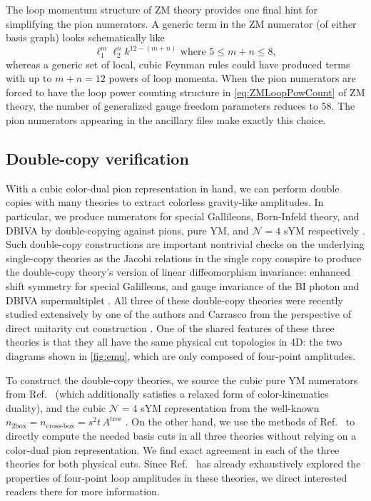 \documentclass[11pt,letter]{article}
\newcommand{\atree}{\ensuremath{A^{\text{tree}}}}
\begin{document}
The loop momentum structure of ZM theory provides one final hint for
simplifying the pion numerators.  A generic term in the ZM numerator
(of either basis graph) looks schematically like
\begin{equation}
\label{eq:ZMLoopPowCount}
\ell_1^m \ell_2^n k^{12-(m+n)} \text{ where } 5 \leq m+n \leq 8,
\end{equation}
whereas a generic set of local, cubic Feynman rules could have
produced terms with up to $m+n=12$ powers of loop momenta.  When the
pion numerators are forced to have the loop power counting structure in
\cref{eq:ZMLoopPowCount} of ZM theory, the number of generalized gauge
freedom parameters reduces to 58.  The pion numerators appearing in the
ancillary files make exactly this choice.

\subsection{Double-copy verification}
\label{doubleCopyVerify}

With a cubic color-dual pion representation in hand, we can perform
double copies with many theories to extract colorless gravity-like
amplitudes.  In particular, we produce numerators for special
Gallileons, Born-Infeld theory, and DBIVA by double-copying against
pions, pure YM, and $\mathcal{N}=4$ sYM respectively
\cite{Cachazo:2014xea,Cheung:2015ota,Cheung:2016drk}.  Such double-copy constructions are important nontrivial
checks on the underlying single-copy theories as the Jacobi relations
in the single copy conspire to produce the double-copy theory's
version of linear diffeomorphism invariance: enhanced shift symmetry for special Galilleons, and gauge
invariance of the BI photon and DBIVA supermultiplet \cite{Hinterbichler:2015pqa}.  All
three of these double-copy theories were recently studied extensively
by one of the authors and Carrasco from the perspective of direct
unitarity cut construction \cite{Carrasco:2023qgz}.  One of the shared
features of these three theories is that they all have the same
physical cut topologies in 4D: the two diagrams shown in
\cref{fig:emu}, which are only composed of four-point amplitudes.

To construct the double-copy theories, we source the cubic
pure YM numerators from Ref.~\cite{Bern:2015ooa} (which
additionally satisfies a relaxed form of color-kinematics duality),
and the cubic $\mathcal{N}=4$ sYM representation from the well-known
$n_{2\text{box}} = n_{\text{cross-box}} = s^2t\, \atree$ \cite{Bern:1997nh}.
On the other hand, we use the methods of Ref.~\cite{Carrasco:2023qgz}
to directly compute the needed basis cuts in all three theories without
relying on a color-dual pion representation.  We find exact agreement
in each of the three theories for both physical cuts.  Since
Ref.~\cite{Carrasco:2023qgz} has already exhaustively explored the
properties of four-point loop amplitudes in these theories, we direct
interested readers there for more information.
\end{document}
